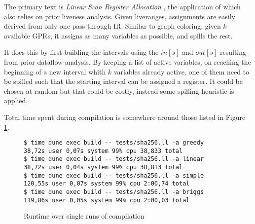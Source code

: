 \documentclass{article}
\begin{document}
The primary text is \textit{Linear Scan Register Allocation} \cite{linear}, the application of which also relies on prior liveness analysis. Given liveranges, assignments are easily derived from only one pass through IR.
Similar to graph coloring, given \(k\) available GPRs, it assigns  as many variables as possible, and spills the rest.

It does this by first building the intervals using the \(\mathit{in}[s]\) and \(\mathit{out}[s]\) resulting from prior dataflow analysis.
By keeping a list of active variables, on reaching the beginning of a new interval whith \(k\) variables already active, one of them need to be spilled such that the starting interval can be assigned a register. It could be chosen at random but that could be costly, instead some spilling heuristic is applied.

Total time spent during compilation is somewhere around those listed in Figure \ref{fig:build-time}.

\begin{figure}[H]
  \centering
  \begin{minipage}[b]{0.69\textwidth}
    \begin{verbatim}
$ time dune exec build -- tests/sha256.ll -a greedy
38,72s user 0,07s system 99% cpu 38,833 total
$ time dune exec build -- tests/sha256.ll -a linear
38,72s user 0,04s system 99% cpu 38,813 total
$ time dune exec build -- tests/sha256.ll -a simple
120,55s user 0,07s system 99% cpu 2:00,74 total
$ time dune exec build -- tests/sha256.ll -a briggs
119,86s user 0,05s system 99% cpu 2:00,03 total
    \end{verbatim}
    \caption{Runtime over single runs of compilation}\label{fig:build-time}
  \end{minipage}
\end{figure}



\end{document}
